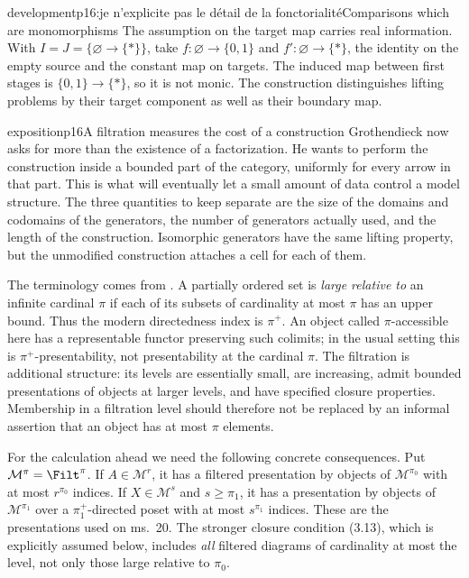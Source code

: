 \begin{dcomment}{development}{p16:je n'explicite pas le détail de la fonctorialité}{Comparisons which are monomorphisms}
The assumption on the target map carries real information. With $I=J=\{\varnothing\to\{*\}\}$, take $f:\varnothing\to\{0,1\}$ and $f':\varnothing\to\{*\}$, the identity on the empty source and the constant map on targets. The induced map between first stages is $\{0,1\}\to\{*\}$, so it is not monic. The construction distinguishes lifting problems by their target component as well as their boundary map.
\end{dcomment}


\begin{dcomment}{exposition}{p16}{A filtration measures the cost of a construction}
Grothendieck now asks for more than the existence of a factorization. He wants to perform the construction inside a bounded part of the category, uniformly for every arrow in that part. This is what will eventually let a small amount of data control a model structure. The three quantities to keep separate are the size of the domains and codomains of the generators, the number of generators actually used, and the length of the construction. Isomorphic generators have the same lifting property, but the unmodified construction attaches a cell for each of them.

The terminology comes from \citet[Expos\'e I, Definitions 9.1--9.3 and 9.12]{SGA4I1972}. A partially ordered set is \emph{large relative to} an infinite cardinal $\pi$ if each of its subsets of cardinality at most $\pi$ has an upper bound. Thus the modern directedness index is $\pi^+$. An object called $\pi$-accessible here has a representable functor preserving such colimits; in the usual setting this is $\pi^+$-presentability, not presentability at the cardinal $\pi$. The filtration is additional structure: its levels are essentially small, are increasing, admit bounded presentations of objects at larger levels, and have specified closure properties. Membership in a filtration level should therefore not be replaced by an informal assertion that an object has at most $\pi$ elements.

For the calculation ahead we need the following concrete consequences. Put $\mathcal M^\pi=\Filt^\pi$. If $A\in\mathcal M^r$, it has a filtered presentation by objects of $\mathcal M^{\pi_0}$ with at most $r^{\pi_0}$ indices. If $X\in\mathcal M^s$ and $s\geq\pi_1$, it has a presentation by objects of $\mathcal M^{\pi_1}$ over a $\pi_1^+$-directed poset with at most $s^{\pi_1}$ indices. These are the presentations used on ms.~20. The stronger closure condition (3.13), which is explicitly assumed below, includes \emph{all} filtered diagrams of cardinality at most the level, not only those large relative to $\pi_0$.


\end{dcomment}
